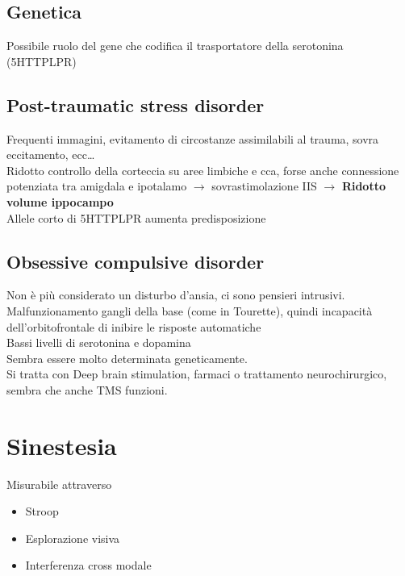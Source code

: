 \documentclass[12pt, a4paper]{article}
\begin{document}
\subsection{Genetica} 

Possibile ruolo del gene che codifica il trasportatore della serotonina\\ (5HTTPLPR)

\subsection{Post-traumatic stress disorder} 

Frequenti immagini, evitamento di circostanze assimilabili al trauma, sovra eccitamento, ecc\ldots
\medskip\\ 
Ridotto controllo della corteccia su aree limbiche e cca, forse anche connessione potenziata tra amigdala e ipotalamo $\rightarrow$ sovrastimolazione IIS $\rightarrow$ \textbf{Ridotto volume ippocampo}
\medskip\\ 
Allele corto di 5HTTPLPR aumenta predisposizione

\subsection{Obsessive compulsive disorder} 

Non è più considerato un disturbo d'ansia, ci sono pensieri intrusivi.
\medskip\\ 
Malfunzionamento gangli della base (come in Tourette), quindi incapacità dell'orbitofrontale di inibire le risposte automatiche
\medskip\\  
Bassi livelli di serotonina e dopamina
\medskip\\ 
Sembra essere molto determinata geneticamente.
\medskip\\ 
Si tratta con Deep brain stimulation, farmaci o trattamento neurochirurgico, sembra che anche TMS funzioni.

\section{Sinestesia}

Misurabile attraverso
\begin{itemize}
    \item Stroop
    \item Esplorazione visiva
    \item Interferenza cross modale
\end{itemize}
\end{document}
